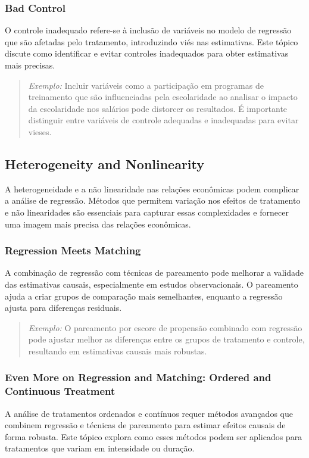 \documentclass[a4paper,12pt]{article}[abntex2]
\begin{document}
\subsubsection{Bad Control}
O controle inadequado refere-se à inclusão de variáveis no modelo de regressão que são afetadas pelo tratamento, introduzindo viés nas estimativas. Este tópico discute como identificar e evitar controles inadequados para obter estimativas mais precisas.

\begin{quote}
\textit{Exemplo:} Incluir variáveis como a participação em programas de treinamento que são influenciadas pela escolaridade ao analisar o impacto da escolaridade nos salários pode distorcer os resultados. É importante distinguir entre variáveis de controle adequadas e inadequadas para evitar vieses.
\end{quote}

\subsection{Heterogeneity and Nonlinearity}
A heterogeneidade e a não linearidade nas relações econômicas podem complicar a análise de regressão. Métodos que permitem variação nos efeitos de tratamento e não linearidades são essenciais para capturar essas complexidades e fornecer uma imagem mais precisa das relações econômicas.

\subsubsection{Regression Meets Matching}
A combinação de regressão com técnicas de pareamento pode melhorar a validade das estimativas causais, especialmente em estudos observacionais. O pareamento ajuda a criar grupos de comparação mais semelhantes, enquanto a regressão ajusta para diferenças residuais.

\begin{quote}
\textit{Exemplo:} O pareamento por escore de propensão combinado com regressão pode ajustar melhor as diferenças entre os grupos de tratamento e controle, resultando em estimativas causais mais robustas.
\end{quote}

\subsubsection{Even More on Regression and Matching: Ordered and Continuous Treatment}
A análise de tratamentos ordenados e contínuos requer métodos avançados que combinem regressão e técnicas de pareamento para estimar efeitos causais de forma robusta. Este tópico explora como esses métodos podem ser aplicados para tratamentos que variam em intensidade ou duração.
\end{document}
